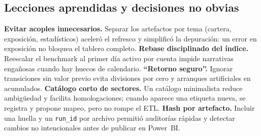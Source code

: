\documentclass[conference]{IEEEtran}
\begin{document}
\begin{table}[!t]
\centering
\caption{KPIs y vistas del tablero}
\label{tab:kpi}
\vspace{-2mm}
\end{table}

\subsection{Lecciones aprendidas y decisiones no obvias}
\textbf{Evitar acoples innecesarios.} Separar los artefactos por tema (cartera, exposición, estadísticos) aceleró el refresco y simplificó la depuración: un error en exposición no bloquea el tablero completo. 
\textbf{Rebase disciplinado del índice.} Reescalar el benchmark al primer día activo por cuenta impide narrativas engañosas cuando hay huecos de calendario. 
\textbf{“Retorno seguro”.} Ignorar transiciones sin valor previo evita divisiones por cero y arranques artificiales en acumulados. 
\textbf{Catálogo corto de sectores.} Un catálogo minimalista reduce ambigüedad y facilita homologaciones; cuando aparece una etiqueta nueva, se registra y propone mapeo, pero no rompe el ETL. 
\textbf{Hash por artefacto.} Incluir una huella y un \texttt{run\_id} por archivo permitió auditorías rápidas y detectar cambios no intencionales antes de publicar en Power~BI.

\end{document}
